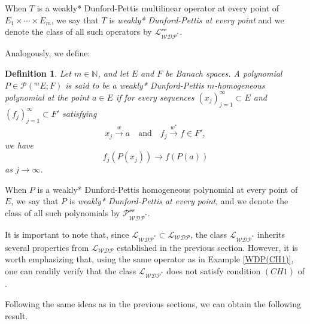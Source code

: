 \documentclass[12 pt]{article}%
\newtheorem{final remark}[theorem]{Final Remark}
\newtheorem{definition}[theorem]{Definition}
\begin{document}
When $T$ is a weakly* Dunford-Pettis multilinear operator at every point of $E_1 \times \cdots \times E_m$, we say that $T$ is \emph{weakly* Dunford-Pettis at every point} and we denote the class of all such operators by $\mathcal{L_{WDP^{*}}^{\text{ev}}}$.

Analogously, we define:

\begin{definition}\label{WDP*PH}
	Let $m \in \mathbb{N}$, and let $E$ and $F$ be Banach spaces. A polynomial $P \in \mathcal{P}(^mE; F)$ is said to be a \emph{weakly* Dunford-Pettis $m$-homogeneous polynomial at the point} $a \in E$ if for every sequences $(x_j)_{j=1}^{\infty} \subset E$ and $(f_j)_{j=1}^{\infty} \subset F'$ satisfying
	\begin{equation*}
		x_j \overset{w}{\longrightarrow} a \quad \text{and} \quad f_j \overset{w^*}{\longrightarrow} f \in F',
	\end{equation*}
	we have
	\begin{equation*}
		f_j(P(x_j)) \longrightarrow f(P(a))
	\end{equation*}
	as $j \to \infty$.
\end{definition}

When $P$ is a weakly* Dunford-Pettis homogeneous polynomial at every point of $E$, we say that $P$ is \emph{weakly* Dunford-Pettis at every point}, and we denote the class of all such polynomials by $\mathcal{P_{WDP^{*}}^{\text{ev}}}$.

It is important to note that, since $\mathcal{L_{WDP^{*}}} \subset \mathcal{L_{WDP}}$, the class $\mathcal{L_{WDP^{*}}}$ inherits several properties from $\mathcal{L_{WDP}}$ established in the previous section. However, it is worth emphasizing that, using the same operator as in Example \ref{WDP(CH1)}, one can readily verify that the class $\mathcal{L_{WDP^{*}}}$ does not satisfy condition $(CH1)$ of \cite{PR14}.

Following the same ideas as in the previous sections, we can obtain the following result.
\end{document}
